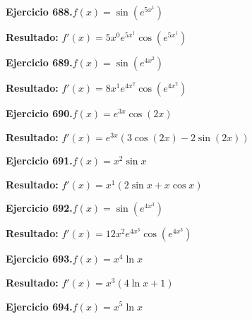 \documentclass[10pt,a4paper]{article}
\begin{document}
\newpage
\begin{ejbox}
\textbf{Ejercicio 688.}\quad $f(x) = \sin(e^{5x^{1}})$
\end{ejbox}

\begin{solbox}
\textbf{Resultado:} \(\displaystyle f'(x) = 5x^{0}e^{5x^{1}}\cos(e^{5x^{1}})\)
\end{solbox}

\begin{ejbox}
\textbf{Ejercicio 689.}\quad $f(x) = \sin(e^{4x^{2}})$
\end{ejbox}

\begin{solbox}
\textbf{Resultado:} \(\displaystyle f'(x) = 8x^{1}e^{4x^{2}}\cos(e^{4x^{2}})\)
\end{solbox}

\begin{ejbox}
\textbf{Ejercicio 690.}\quad $f(x) = e^{3x} \cos(2x)$
\end{ejbox}

\begin{solbox}
\textbf{Resultado:} \(\displaystyle f'(x) = e^{3x}(3\cos(2x) - 2\sin(2x))\)
\end{solbox}

\newpage
\begin{ejbox}
\textbf{Ejercicio 691.}\quad $f(x) = x^{2} \sin x$
\end{ejbox}

\begin{solbox}
\textbf{Resultado:} \(\displaystyle f'(x) = x^{1}(2\sin x + x\cos x)\)
\end{solbox}

\begin{ejbox}
\textbf{Ejercicio 692.}\quad $f(x) = \sin(e^{4x^{3}})$
\end{ejbox}

\begin{solbox}
\textbf{Resultado:} \(\displaystyle f'(x) = 12x^{2}e^{4x^{3}}\cos(e^{4x^{3}})\)
\end{solbox}

\begin{ejbox}
\textbf{Ejercicio 693.}\quad $f(x) = x^{4} \ln x$
\end{ejbox}

\begin{solbox}
\textbf{Resultado:} \(\displaystyle f'(x) = x^{3}(4\ln x + 1)\)
\end{solbox}

\newpage
\begin{ejbox}
\textbf{Ejercicio 694.}\quad $f(x) = x^{5} \ln x$
\end{ejbox}
\end{document}
